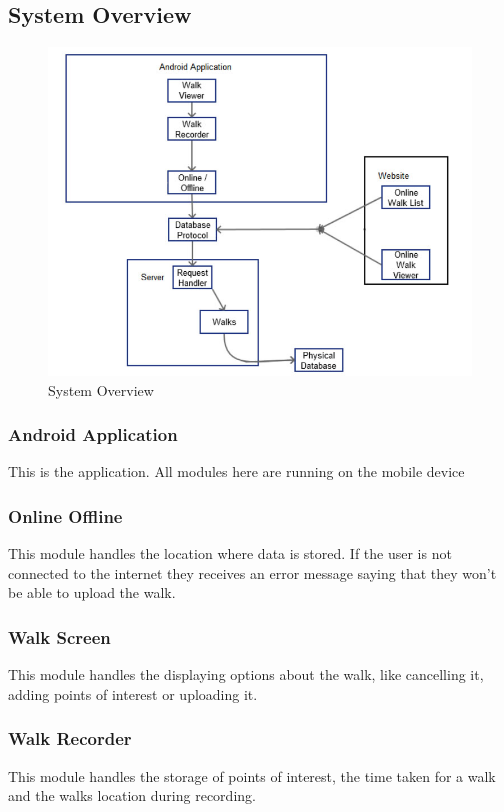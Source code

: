 \documentclass[12pt]{article}
\begin{document}
\subsection{System Overview}
\begin{figure}[htp]
\centering
\includegraphics[scale=0.50]{Project_Plan/docs/ProjectPlan2-3.jpg}
\caption{System Overview}
\label{System Overview}
\end{figure}
\subsubsection{Android Application}
This is the application. All modules here are running on the mobile device
\subsubsection{Online Offline}
This module handles the location where data is stored. If the user is not connected to the internet they receives an error message saying that they won't be able to upload the walk.
\subsubsection{Walk Screen}
This module handles the displaying options about the walk, like cancelling it, adding points of interest or uploading it.
\subsubsection{Walk Recorder}
This module handles the storage of points of interest, the time taken for a walk and the walks location during recording.
\end{document}
